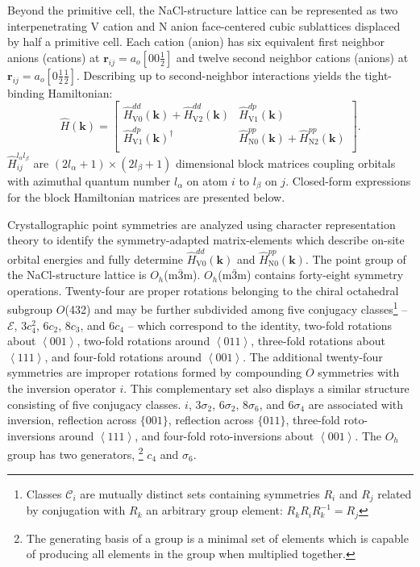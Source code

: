 \documentclass[twocolumn,showpacs,preprintnumbers,superscriptaddress,prb,floatfix,aps,10pt]{revtex4-1}
\renewcommand{\vec}[1]{\ensuremath{\mathbf{#1}}}
\newcommand*{\ham}{\hat{H}}
\newcommand*{\class}{\mathcal{C}}
\newcommand*{\id}{\mathcal{E}}
\newcommand*{\bondvec}{\vec{r}_{ij}}
\begin{document}
Beyond the primitive cell, the NaCl-structure lattice can be represented as two interpenetrating V cation and N anion face-centered cubic sublattices displaced by half a primitive cell. Each cation (anion) has six equivalent first neighbor anions (cations) at $\bondvec = a_o [0 0 \frac{1}{2}]$ and twelve second neighbor cations (anions) at $\bondvec = a_o[0 \frac{1}{2} \frac{1}{2}]$. Describing up to second-neighbor interactions yields the tight-binding Hamiltonian:
%
\begin{equation}
\label{eq:ham_explicit}
\ham(\vec{k}) = 
\begin{bmatrix}
\ham_{\textrm{V}0}^{dd}(\vec{k}) + \ham_{\textrm{V}2}^{dd}(\vec{k}) &\ham_{\textrm{V}1}^{dp}(\vec{k}) \\
\ham_{\textrm{V}1}^{dp}(\vec{k})^{\dagger} & \ham_{\textrm{N}0}^{pp}(\vec{k}) + \ham_{\textrm{N}2}^{pp}(\vec{k}) \\
\end{bmatrix} .
\end{equation}
%
$\ham_{ij}^{l_\alpha l_\beta}$ are $(2l_\alpha+1)\times(2l_\beta+1)$ dimensional block matrices coupling orbitals with azimuthal quantum number $l_\alpha$ on atom $i$ to $l_\beta$ on $j$. Closed-form expressions for the block Hamiltonian matrices are presented below.

Crystallographic point symmetries are analyzed using character representation theory to identify the symmetry-adapted matrix-elements which describe on-site orbital energies and fully determine $\ham_{\textrm{V}0}^{dd}(\vec{k}) $ and $\ham_{\textrm{N}0}^{pp}(\vec{k})$. The point group of the NaCl-structure lattice is $O_h$(m$\bar{3}$m). $O_h$(m$\bar{3}$m) contains forty-eight symmetry operations. Twenty-four are proper rotations belonging to the chiral octahedral subgroup $O$(432) and may be further subdivided among five conjugacy classes\footnote{Classes $\class_i$ are mutually distinct sets containing symmetries $R_i$ and $R_j$ related by conjugation with $R_k$ an arbitrary group element: $R_kR_iR_k^{-1}=R_j$} --  $\id$, $3c_4^2$, $6c_2$, $8c_3$, and $6c_4$ -- which correspond to the identity, two-fold rotations about $\left<001\right>$, two-fold rotations around $\left<011\right>$, three-fold rotations about $\left<111\right>$, and four-fold rotations around $\left<001\right>$. The additional twenty-four symmetries are improper rotations formed by compounding $O$ symmetries with the inversion operator $i$. This complementary set also displays a similar structure consisting of five conjugacy classes. $i$, $3\sigma_2$, $6\sigma_2$, $8\sigma_6$, and $6\sigma_4$ are associated with inversion, reflection across $\{001\}$, reflection across $\{011\}$, three-fold roto-inversions around $\left<111\right>$, and four-fold roto-inversions about $\left<001\right>$. The $O_h$ group has two generators, \footnote{The generating basis of a group is a minimal set of elements which is capable of producing all elements in the group when multiplied together.} $c_4$ and $\sigma_6$.
\end{document}
